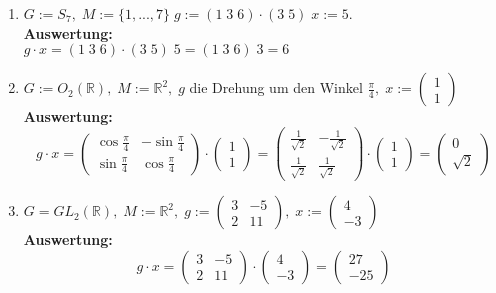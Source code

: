 \documentclass[11pt,a4paper,ngerman]{article}
\newcommand{\R}{\mathbb{R}}
\begin{document}
\begin{enumerate}[\bfseries a)]
\item $G := S_7, \; M := \{ 1, ...,7 \} \; g := (1 \; 3 \; 6) \cdot (3 \;5 ) \; x:=5$.\\

\textbf{Auswertung:}\\
$g \cdot x = ( 1 \; 3 \; 6) \cdot ( 3 \; 5 ) \;5= (1 \; 3 \; 6) \; 3 = 6$

\item $G := O_2 ( \R ), \; M := \R ^2, \; g$ die Drehung um den Winkel $\frac{\pi }{4}, \; x := \begin{pmatrix}1 \\ 1 \end{pmatrix}$\\

\textbf{Auswertung:}\\
$$
g \cdot x = \begin{pmatrix} \cos \frac{\pi }{4} & - \sin \frac{\pi }{4} \\ \sin \frac{\pi }{4} & \cos \frac{\pi }{4} \end{pmatrix} \cdot \begin{pmatrix} 1 \\ 1 \end{pmatrix} = \begin{pmatrix} \frac{1}{\sqrt{2}} & -\frac{1}{\sqrt{2}} \\ \frac{1}{\sqrt{2}} & \frac{1}{\sqrt{2}} \end{pmatrix} \cdot \begin{pmatrix}1 \\ 1 \end{pmatrix} = \begin{pmatrix} 0 \\ \sqrt{2} \end{pmatrix}
$$

\item $G = GL_2( \R ), \; M := \R ^2,\; g := \begin{pmatrix} 3 & -5 \\ 2 & 11 \end{pmatrix}, \; x := \begin{pmatrix} 4 \\ -3 \end{pmatrix}$\\

\textbf{Auswertung:}\\
$$
g \cdot x = \begin{pmatrix} 3 & -5 \\ 2 & 11 \end{pmatrix} \cdot \begin{pmatrix} 4 \\ -3 \end{pmatrix} = \begin{pmatrix} 27 \\ -25 \end{pmatrix}
$$
\end{enumerate}

\label{LastPage}
\end{document}
